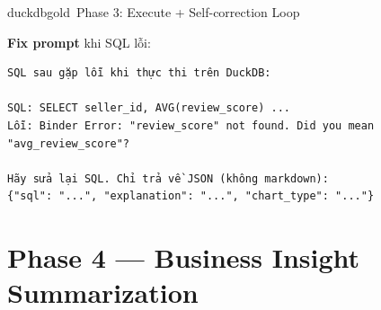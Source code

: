 \documentclass[12pt, a4paper]{article}
\begin{document}
\begin{phasebox}{duckdbgold}{\faDatabase\ Phase 3: Execute + Self-correction Loop}
\begin{center}
\end{center}

\vspace{0.5em}

\textbf{Fix prompt} khi SQL lỗi:
\begin{codebox}[title={Self-correction prompt gửi cho Groq}]
\begin{verbatim}
SQL sau gặp lỗi khi thực thi trên DuckDB:

SQL: SELECT seller_id, AVG(review_score) ...
Lỗi: Binder Error: "review_score" not found. Did you mean "avg_review_score"?

Hãy sửa lại SQL. Chỉ trả về JSON (không markdown):
{"sql": "...", "explanation": "...", "chart_type": "..."}
\end{verbatim}
\end{codebox}

\end{phasebox}

\section{Phase 4 — Business Insight Summarization}
\end{document}
